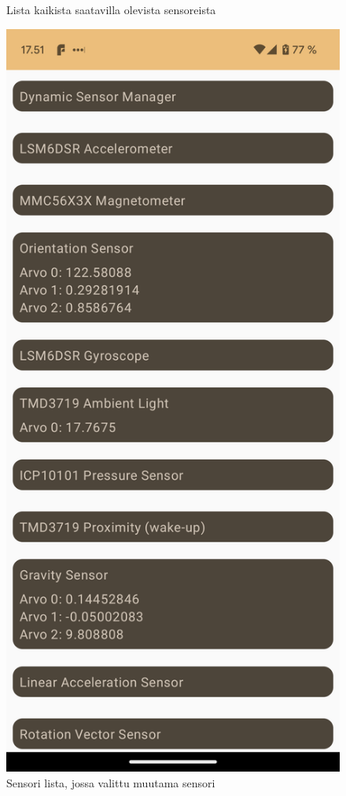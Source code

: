\begin{figure}[h!]
\begin{minipage}[b]{.4\textwidth}
        \caption{Lista kaikista saatavilla olevista sensoreista}
        \label{fig:exercise-11-sensor-list}
    \end{minipage}\qquad
    \begin{minipage}[b]{.4\textwidth}
        \includegraphics[width=\textwidth]{figures/exercise-11-sensors-selected.png}
        \caption{Sensori lista, jossa valittu muutama sensori}
        \label{fig:exercise-11-sensors-selected}
    \end{minipage}
\end{figure}

